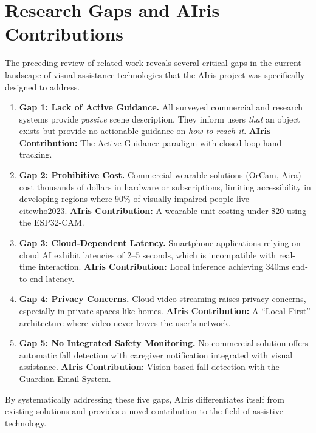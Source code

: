 \documentclass[12pt,a4paper]{report}
\begin{document}
\section{Research Gaps and AIris Contributions}

The preceding review of related work reveals several critical gaps in the current landscape of visual assistance technologies that the AIris project was specifically designed to address.

\begin{enumerate}
    \item \textbf{Gap 1: Lack of Active Guidance.} All surveyed commercial and research systems provide \textit{passive} scene description. They inform users \textit{that} an object exists but provide no actionable guidance on \textit{how to reach it}. \textbf{AIris Contribution:} The Active Guidance paradigm with closed-loop hand tracking.

    \item \textbf{Gap 2: Prohibitive Cost.} Commercial wearable solutions (OrCam, Aira) cost thousands of dollars in hardware or subscriptions, limiting accessibility in developing regions where 90\% of visually impaired people live \\cite{who2023}. \textbf{AIris Contribution:} A wearable unit costing under \$20 using the ESP32-CAM.

    \item \textbf{Gap 3: Cloud-Dependent Latency.} Smartphone applications relying on cloud AI exhibit latencies of 2--5 seconds, which is incompatible with real-time interaction. \textbf{AIris Contribution:} Local inference achieving 340ms end-to-end latency.

    \item \textbf{Gap 4: Privacy Concerns.} Cloud video streaming raises privacy concerns, especially in private spaces like homes. \textbf{AIris Contribution:} A ``Local-First'' architecture where video never leaves the user's network.

    \item \textbf{Gap 5: No Integrated Safety Monitoring.} No commercial solution offers automatic fall detection with caregiver notification integrated with visual assistance. \textbf{AIris Contribution:} Vision-based fall detection with the Guardian Email System.
\end{enumerate}

By systematically addressing these five gaps, AIris differentiates itself from existing solutions and provides a novel contribution to the field of assistive technology.
\end{document}
